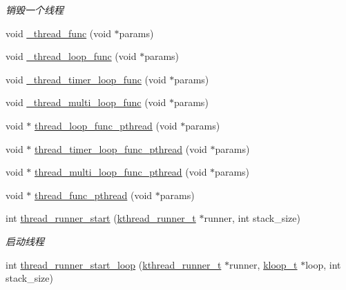 \begin{DoxyCompactItemize}
\begin{DoxyCompactList}\small\item\em 销毁一个线程 \end{DoxyCompactList}\item 
void \hyperlink{a00084_ae1217c770962ea59a20fa931ad6fee0c_ae1217c770962ea59a20fa931ad6fee0c}{\+\_\+thread\+\_\+func} (void $\ast$params)
\item 
void \hyperlink{a00084_ad2578ccaa4c6ce7670eabd9575204c38_ad2578ccaa4c6ce7670eabd9575204c38}{\+\_\+thread\+\_\+loop\+\_\+func} (void $\ast$params)
\item 
void \hyperlink{a00084_af3540c31c89a280433080939f96da861_af3540c31c89a280433080939f96da861}{\+\_\+thread\+\_\+timer\+\_\+loop\+\_\+func} (void $\ast$params)
\item 
void \hyperlink{a00084_af85e5a51f4ff2866c5db552529646165_af85e5a51f4ff2866c5db552529646165}{\+\_\+thread\+\_\+multi\+\_\+loop\+\_\+func} (void $\ast$params)
\item 
void $\ast$ \hyperlink{a00084_a4f94afc82ab1358bdfdaa1739ca71655_a4f94afc82ab1358bdfdaa1739ca71655}{thread\+\_\+loop\+\_\+func\+\_\+pthread} (void $\ast$params)
\item 
void $\ast$ \hyperlink{a00084_a878593e36d665dc3334cf71e88bf93e6_a878593e36d665dc3334cf71e88bf93e6}{thread\+\_\+timer\+\_\+loop\+\_\+func\+\_\+pthread} (void $\ast$params)
\item 
void $\ast$ \hyperlink{a00084_acd0090cfcdc1ccc4cc778a0a70d20e57_acd0090cfcdc1ccc4cc778a0a70d20e57}{thread\+\_\+multi\+\_\+loop\+\_\+func\+\_\+pthread} (void $\ast$params)
\item 
void $\ast$ \hyperlink{a00084_a75b9d7e4a1d3734e2a4c0ba298b1578c_a75b9d7e4a1d3734e2a4c0ba298b1578c}{thread\+\_\+func\+\_\+pthread} (void $\ast$params)
\item 
int \hyperlink{a00112_gae125061eb96b154766c0a414eb74065c_gae125061eb96b154766c0a414eb74065c}{thread\+\_\+runner\+\_\+start} (\hyperlink{a00053_a4f78c259c9527c821f1a6f87495dd339_a4f78c259c9527c821f1a6f87495dd339}{kthread\+\_\+runner\+\_\+t} $\ast$runner, int stack\+\_\+size)
\begin{DoxyCompactList}\small\item\em 启动线程 \end{DoxyCompactList}\item 
int \hyperlink{a00112_ga4328cb11f2446f4da89374a1ae8a2f8e_ga4328cb11f2446f4da89374a1ae8a2f8e}{thread\+\_\+runner\+\_\+start\+\_\+loop} (\hyperlink{a00053_a4f78c259c9527c821f1a6f87495dd339_a4f78c259c9527c821f1a6f87495dd339}{kthread\+\_\+runner\+\_\+t} $\ast$runner, \hyperlink{a00053_a97fc76209a58362019f1ded9169e397f_a97fc76209a58362019f1ded9169e397f}{kloop\+\_\+t} $\ast$loop, int stack\+\_\+size)

\end{DoxyCompactItemize}
